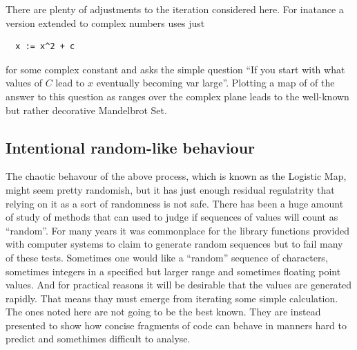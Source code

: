 There are plenty of adjustments to the iteration considered here. For
inatance a version extended to complex numbers uses just
\begin{verbatim}
  x := x^2 + c
\end{verbatim}
for some complex constant \verb@c@ and asks the simple question
``If you start with  what values of $C$ lead to $x$ eventually
becoming var large''. Plotting a map of of the answer to this question as
\verb@c@ ranges over the complex plane leads to the well-known but
rather decorative Mandelbrot Set\cite{mandelbrot}. 
\subsection{Intentional random-like behaviour}
The chaotic behavour of the above process, which is known as the
Logistic Map, might seem pretty randomish, but it has just enough
residual regulatrity that relying on it as a sort of randomness is not
safe. There has been a huge amount of study of methods that can used to
judge if sequences of values will count as ``random''. For many years
it was commonplace for the library functions provided with computer
systems to claim to generate random sequences but to fail many of
these tests. Sometimes one would like a ``random'' sequence of
characters, sometimes integers in a specified but larger range and
sometimes floating point values. And for practical reasons it
will be desirable that the values are generated rapidly. That means
thay must emerge from iterating some simple calculation.
The ones noted here are not going to be the best known. They are instead
presented to show how concise fragments of code can behave in manners
hard to predict and somethimes difficult to analyse.
